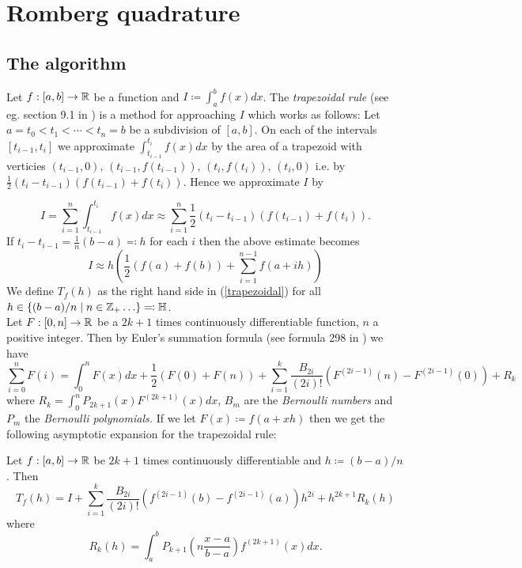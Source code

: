 \chapter{Romberg quadrature}

\section{The algorithm}

Let \(f:[a,b] \rightarrow \mathbb{R}\) be a function and \(I\coloneqq \int_a^bf(x)dx\). The {\it trapezoidal rule} (see eg. section 9.1 in \cite{dh}) is a method for approaching \(I\) which works as follows: Let \(a = t_0 < t_1 < \cdots < t_n = b\) be a subdivision of \([a,b]\). On each of the intervals \([t_{i-1},t_i]\) we approximate \(\int_{t_{i-1}}^{t_i}f(x)dx\) by the area of a trapezoid with verticies \((t_{i-1},0),\,(t_{i-1}, f(t_{i-1})),\,(t_i,f(t_i)),\, (t_i,0)\) i.e. by \(\frac{1}{2}(t_i - t_{i-1})(f(t_{i-1}) + f(t_i))\). Hence we approximate \(I\) by 

\[
I = \sum_{i=1}^n \int_{t_{i-1}}^{t_i}f(x)dx \approx \sum_{i=1}^n\frac{1}{2}(t_i - t_{i-1})(f(t_{i-1}) + f(t_i)).
\]
If \(t_i - t_{i-1} = \frac{1}{n}(b-a)\eqqcolon h\) for each \(i\) then the above estimate becomes
\begin{equation}\label{trapezoidal}
I \approx h \left(\frac{1}{2}(f(a) + f(b)) + \sum_{i=1}^{n-1}f(a + ih)\right)
\end{equation}
We define \(T_f(h)\) as the right hand side in (\ref{trapezoidal}) for all \(h\in \{(b-a)/n\mid n \in \mathbb{Z}_+\ldots\}\eqqcolon \mathbb{H}\).\\

Let \(F:[0, n]\rightarrow \mathbb{R}\) be a \(2k+1\) times continuously differentiable function, \(n\) a positive integer. Then by Euler's summation formula (see formula 298 in \cite{kn}) we have
\begin{equation}
\sum_{i=0}^nF(i) = \int_0^nF(x)dx + \frac{1}{2}(F(0) + F(n)) + \sum_{i=1}^k\frac{B_{2i}}{(2i)!}(F^{(2i-1)}(n) - F^{(2i-1)}(0)) + R_k
\end{equation}
where \(R_k = \int_0^nP_{2k+1}(x)F^{(2k+1)}(x)dx\), \(B_m\) are the {\it Bernoulli numbers} and \(P_m\) the {\it Bernoulli polynomials.} If we let \(F(x)\coloneqq f(a + xh)\) then we get the following asymptotic expansion for the trapezoidal rule:

\begin{theorem}
Let \(f:[a,b] \rightarrow \mathbb{R}\) be \(2k+1\) times continuously differentiable and \(h \coloneqq (b-a)/n\). Then 
\begin{equation}
T_f(h) = I + \sum_{i=1}^k\frac{B_{2i}}{(2i)!}(f^{(2i-1)}(b) - f^{(2i-1)}(a))h^{2i} + h^{2k+1}R_k(h)
\end{equation}
where
\begin{equation}
R_k(h) = \int_a^bP_{k+1}\left(n\frac{x-a}{b-a}\right)f^{(2k+1)}(x)dx. 
\end{equation}
\end{theorem}

